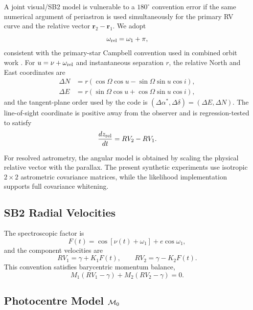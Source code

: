 A joint visual/SB2 model is vulnerable to a $180^\circ$ convention error if the same numerical argument of periastron is used simultaneously for the primary RV curve and the relative vector $\mathbf r_2-\mathbf r_1$. We adopt
\begin{equation}
\omega_{\rm rel}=\omega_1+\pi,
\label{eq:omegarel}
\end{equation}
consistent with the primary-star Campbell convention used in combined orbit work \citep{Leclerc2023}. For $u=\nu+\omega_{\rm rel}$ and instantaneous separation $r$, the relative North and East coordinates are
\begin{align}
\Delta N &= r(\cos\Omega\cos u-\sin\Omega\sin u\cos i),\\
\Delta E &= r(\sin\Omega\cos u+\cos\Omega\sin u\cos i),
\end{align}
and the tangent-plane order used by the code is $(\Delta\alpha^\ast,\Delta\delta)=(\Delta E,\Delta N)$. The line-of-sight coordinate is positive away from the observer and is regression-tested to satisfy
\begin{equation}
\frac{dz_{\rm rel}}{dt}=RV_2-RV_1.
\end{equation}

For resolved astrometry, the angular model is obtained by scaling the physical relative vector with the parallax. The present synthetic experiments use isotropic $2\times2$ astrometric covariance matrices, while the likelihood implementation supports full covariance whitening.

\subsection{SB2 Radial Velocities}

The spectroscopic factor is
\begin{equation}
F(t)=\cos[\nu(t)+\omega_1]+e\cos\omega_1,
\end{equation}
and the component velocities are
\begin{equation}
RV_1=\gamma+K_1F(t),\qquad RV_2=\gamma-K_2F(t).
\label{eq:rv}
\end{equation}
This convention satisfies barycentric momentum balance,
\begin{equation}
M_1(RV_1-\gamma)+M_2(RV_2-\gamma)=0.
\end{equation}

\subsection{Photocentre Model $\mathcal{M}_0$}

